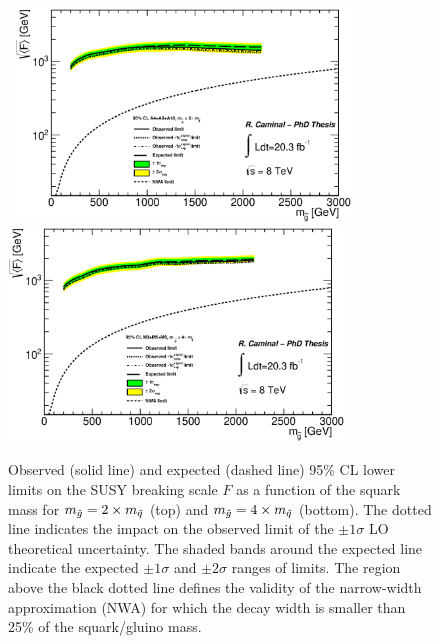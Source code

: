 \begin{figure}[!ht]
\begin{center}
\mbox{
\includegraphics[width=0.795\textwidth]{Interpretations/Figures/ModelIndependentGravitino_combined_sqrtFLimit_Stop_A4_A9_A102mqmg.eps}
}
\mbox{
\includegraphics[width=0.795\textwidth]{Interpretations/Figures/ModelIndependentGravitino_combined_sqrtFLimit_Stop_A4_A9_A104mqmg.eps}
}
\end{center}
\caption[95\% CL lower limits on the SUSY breaking scale $F$ as a function of the squark mass for $m_{\gluino} = 2 \times m_{\squark}$ and $m_{\gluino} = 4 \times m_{\squark}$.]{Observed (solid line) and expected (dashed line) 95\% CL lower limits on the SUSY breaking scale $F$ as a function of the squark mass for $m_{\gluino} = 2 \times m_{\squark}$ (top) and $m_{\gluino} = 4 \times m_{\squark}$ (bottom). The dotted line indicates the impact on the observed limit of the $\pm1\sigma$ LO theoretical uncertainty. The shaded bands around the expected line indicate the expected $\pm1\sigma$ and $\pm2\sigma$ ranges of limits. 
  The region above the black dotted line defines the validity of the narrow-width approximation (NWA) for which the decay width is smaller than 25\% of the squark/gluino mass.}
\label{fig:GravitinoSqrtFExclusion_xmqmg}
\end{figure}

